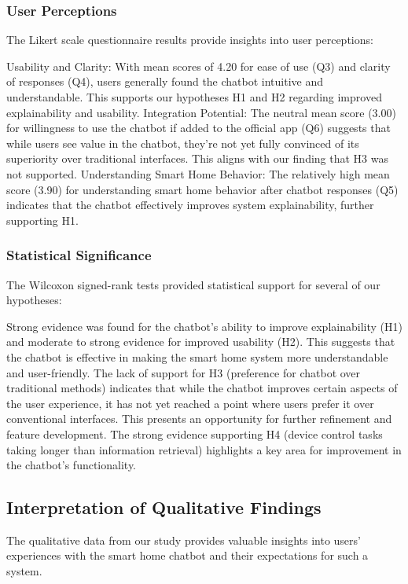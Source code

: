 \subsubsection{User Perceptions}
The Likert scale questionnaire results provide insights into user perceptions:

Usability and Clarity: With mean scores of 4.20 for ease of use (Q3) and clarity of responses (Q4), users generally found the chatbot intuitive and understandable. This supports our hypotheses H1 and H2 regarding improved explainability and usability.
Integration Potential: The neutral mean score (3.00) for willingness to use the chatbot if added to the official app (Q6) suggests that while users see value in the chatbot, they're not yet fully convinced of its superiority over traditional interfaces. This aligns with our finding that H3 was not supported.
Understanding Smart Home Behavior: The relatively high mean score (3.90) for understanding smart home behavior after chatbot responses (Q5) indicates that the chatbot effectively improves system explainability, further supporting H1.

\subsubsection{Statistical Significance}
The Wilcoxon signed-rank tests provided statistical support for several of our hypotheses:

Strong evidence was found for the chatbot's ability to improve explainability (H1) and moderate to strong evidence for improved usability (H2). This suggests that the chatbot is effective in making the smart home system more understandable and user-friendly.
The lack of support for H3 (preference for chatbot over traditional methods) indicates that while the chatbot improves certain aspects of the user experience, it has not yet reached a point where users prefer it over conventional interfaces. This presents an opportunity for further refinement and feature development.
The strong evidence supporting H4 (device control tasks taking longer than information retrieval) highlights a key area for improvement in the chatbot's functionality.

\subsection{Interpretation of Qualitative Findings}
The qualitative data from our study provides valuable insights into users' experiences with the smart home chatbot and their expectations for such a system.
